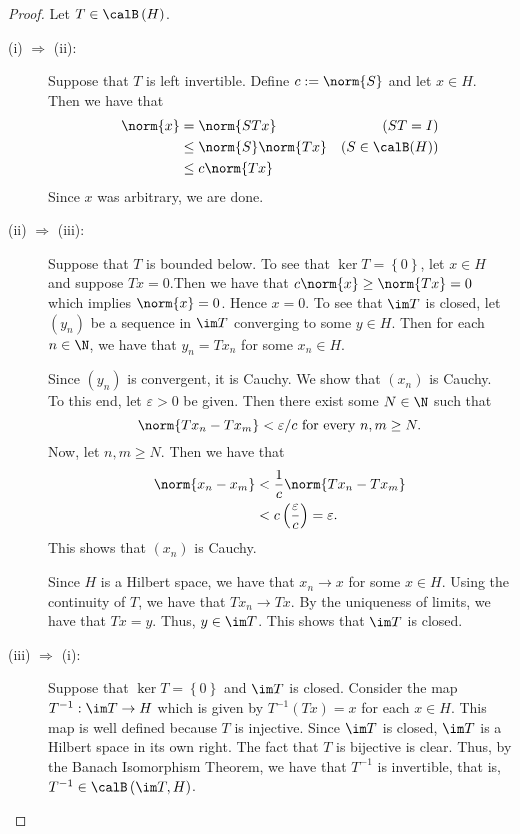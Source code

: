 \horz
\begin{proof}
    Let $T\in \calB \left( H \right)$.
   	\begin{description}
	    \item[(i) $\Longrightarrow$ (ii):]  Suppose that $T$ is left invertible. Define $c:=\norm{S}$ and let $x\in H$. Then we have that
		\begin{align*}
		    \norm{x}&=\norm{STx} & (ST=I) \\
		    &\le \norm{S}\norm{Tx} & (S\in \calB (H)) \\
		    &\le c\norm{Tx}
		\end{align*}
		Since $x$ was arbitrary, we are done.
	    \item[(ii) $\Longrightarrow$ (iii):] Suppose that $T$ is bounded below. To see that $\ker T =\left\{ 0 \right\}$, let $x\in H$ and suppose $Tx=0$.Then we have that $c\norm{x} \ge \norm{Tx} =0$ which implies $\norm{x}=0$. Hence $x=0$.
		To see that $\im T$ is closed, let $\left( y_{n} \right)$ be a sequence in $\im T$ converging to some $y \in H$. Then for each $n\in \N$, we have that $y_{n}=Tx_{n}$ for some $x_{n} \in H$.

		Since $\left( y_{n} \right)$ is convergent, it is Cauchy. We show that $\left( x_{n} \right)$ is Cauchy. To this end, let $\varepsilon > 0$ be given. Then there exist some $N\in \N$ such that
		\begin{equation*}
		    \norm{Tx_{n}-Tx_{m}} < \varepsilon / c \text{ for every } n,m \ge N.
		\end{equation*}
		Now, let $n,m \ge N$. Then we have that
		\begin{align*}
		    \norm{x_{n}-x_{m}} &< \frac{1}{c} \norm{Tx_{n}-Tx_{m}} \\
		    &< c \left( \frac{\varepsilon}{c} \right) = \varepsilon.
		\end{align*}
		This shows that $\left( x_{n} \right)$ is Cauchy.

		Since $H$ is a Hilbert space, we have that $x_{n} \to x$ for some $x\in H$. Using the continuity of $T$, we have that $Tx_{n} \to Tx$. By the uniqueness of limits, we have that $Tx=y$. Thus, $y\in \im T$. This shows that $\im T$ is closed.

	    \item[(iii) $\Rightarrow$ (i):] Suppose that $\ker T =\left\{ 0 \right\}$ and $\im T$ is closed. Consider the map $T^{-1} : \im T \to H$ which is given by $T^{-1}\left( Tx \right)=x$ for each $x\in H$. This map is well defined because $T$ is injective. Since $\im T$ is closed, $\im T$ is a Hilbert space in its own right. The fact that $T$ is bijective is clear. Thus, by the Banach Isomorphism Theorem, we have that $T^{-1}$ is invertible, that is, $T^{-1} \in \calB \left( \im T, H \right)$.


\end{description}
\end{proof}
